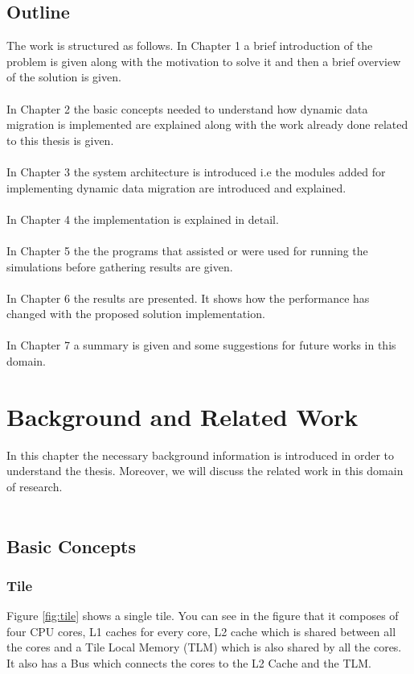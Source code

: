 \documentclass{listhesis}
\begin{document}
\section{Outline}
The work is structured as follows. In Chapter 1 a brief introduction of the problem is given along with the motivation to solve it and then a brief overview of the solution is given.\\
\\
In Chapter 2 the basic concepts needed to understand how dynamic data migration is implemented are explained along with the work already done related to this thesis is given.\\
\\
In Chapter 3 the system architecture is introduced i.e the modules added for implementing dynamic data migration are introduced and explained. \\
\\
In Chapter 4 the implementation is explained in detail. \\
\\
In Chapter 5 the the programs that assisted or were used for running the simulations before gathering results are given. \\
\\
In Chapter 6 the results are presented. It shows how the performance has changed with the proposed solution implementation. \\
\\
In Chapter 7 a summary is given and some suggestions for future works in this domain. 
\chapter{Background and Related Work}
In this chapter the necessary background information is introduced in order to understand the thesis. Moreover, we will discuss the related work in this domain of research.\\
\\
\section{Basic Concepts}
\subsection{Tile}
Figure \ref{fig:tile} shows a single tile. You can see in the figure that it composes of four CPU cores, L1 caches for every core, L2 cache which is shared between all the cores and a Tile Local Memory (TLM) which is also shared by all the cores. It also has a Bus which connects the cores to the L2 Cache and the TLM.
\end{document}
